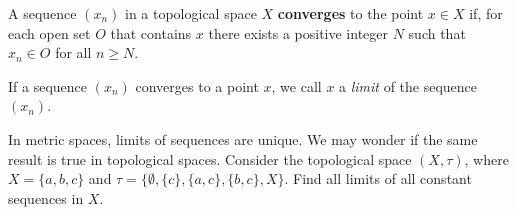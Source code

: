 \begin{definition} A sequence $(x_n)$ in a topological space $X$ \textbf{converges} to the point $x \in X$ if, for each open set $O$ that contains $x$ there exists a positive integer $N$ such that $x_n \in O$ for all $n \geq N$. 
\end{definition}

If a sequence $(x_n)$ converges to a point $x$, we call $x$ a \emph{limit} of the sequence $(x_n)$. 

\begin{activity} \label{act:TS_limits} In metric spaces, limits of sequences are unique. We may wonder if the same result is true in topological spaces. Consider the topological space $(X,\tau)$, where $X = \{a, b, c\}$ and $\tau = \{\emptyset, \{c\}, \{a, c\}, \{b, c\}, X\}$. Find all limits of all constant sequences in $X$.

\end{activity}

\begin{comment}

\ActivitySolution We start by finding all neighborhoods. 
\begin{itemize}
\item The neighborhoods of $a$ are $\{a,c\}$ and $X$.
\item The neighborhoods of $b$ are $\{b,c\}$ and $X$.
\item The neighborhoods of $c$ are $\{c\}$, $\{a,c\}$, $\{b,c\}$, and $X$.
\end{itemize}

Consider the sequence $(a)$. The neighborhood $\{b,c\}$ of $b$ does not contain $a$, so $b$ is not a limit of the sequence $(a)$. The neighborhood $\{c\}$ of $c$ does not contain $a$, so $c$ is not a limit of the sequence $(a)$. Therefore, the only limit of the sequence $(a)$ is $a$.

Now consider the sequence $(b)$. The neighborhood $\{a,c\}$ of $a$ does not contain $b$, so $a$ is not a limit of the sequence $(a)$. The neighborhood $\{c\}$ of $c$ does not contain $b$, so $c$ is not a limit of the sequence $(b)$. Therefore, the only limit of the sequence $(b)$ is $b$.

Finally, consider the sequence $(c)$.  Each neighborhood of $a$ and $b$ contains the entire sequence $(c)$, so $a$ and $b$ are both limits of $(c)$. It follows that every point in $X$ is a limit of the sequence $(a)$.

\end{comment}


